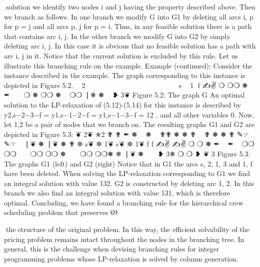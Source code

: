 \documentclass[titlepage]{book}
\theoremstyle{plain}
\theoremstyle{definition}
\theoremstyle{remark}
\begin{document}
solution we identify two nodes i and j having the property described above. Then we branch as follows.
In one branch we modify G into G1 by deleting all arcs {i, p} for p = j and all arcs {p, j} for p = i. Thus,
in any feasible solution there is a path that contains arc {i, j}. In the other branch we modify G into G2
by simply deleting arc {i, j}. In this case it is obvious that no feasible solution has a path with arc {i, j}
in it. Notice that the current solution is excluded by this rule. Let us illustrate this branching rule on
the example.
Example (continued): Consider the instance described in the example. The graph corresponding to
this instance is depicted in Figure 5.2.
❦
✯2
✟✟
✒
 
❅
✟✟  
❅
✟
 
❅
✟✟ ✎☞
✟
 
❘ ❦
❅
✲
s❦ ✲ 1❦
f
✍✌
❍
❍❍
❅
✒
 
 
❍
❅
❍❍ ❅
 
❍❍
❘❄
❅
 
❥
3❦
Figure 5.2: The graph G
An optimal solution to the LP-relaxation of (5.12)-(5.14) for this instance is described by y2,s−2−3−f =
y1,s−1−2−f = y1,s−1−3−f = 12 , and all other variables 0. Now, let 1,2 be a pair of nodes that we branch
on. The resulting graphs G1 and G2 are depicted in Figure 5.3:
❦
2❦
✯2
✟
✟
✒ ❅
 
❅
 
✟✟
❅
❅
✟
 
✟
❅
❅
✟
✎☞
✎☞
 
❘❦
❅
❘❦
❅
✟
✲
s❦ ✲ 1❦
s❦ ✲ 1❦
f
f
✍✌
✍✌
❍
❍
❅
✒
 
✒
 
❍❍
❍❍
 
 
❍❍
❍❍ ❅
 
 
❍❍
❍❍❅
❄
❘❦
❅
 
 
❥ 3❄
❍
❍
❥
❦
3
Figure 5.3: The graphs G1 (left) and G2 (right)
Notice that in G1 the arcs {s, 2}, {1, 3} and {1, f } have been deleted. When solving the LP-relaxation
corresponding to G1 we find an integral solution with value 132. G2 is constructed by deleting arc {1, 2}.
In this branch we also find an integral solution with value 131, which is therefore optimal.
Concluding, we have found a branching rule for the hierarchical crew scheduling problem that preserves
69

the structure of the original problem. In this way, the efficient solvability of the pricing problem remains
intact throughout the nodes in the branching tree. In general, this is the challenge when devising
branching rules for integer programming problems whose LP-relaxation is solved by column generation.
\end{document}

